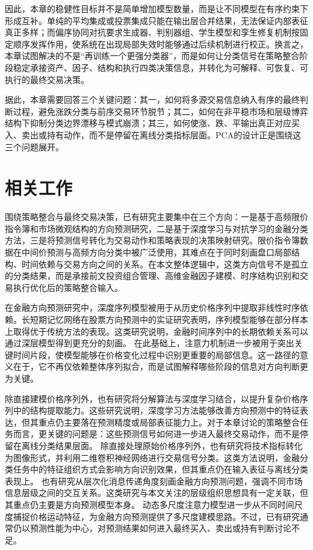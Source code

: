 因此，本章的稳健性目标并不是简单增加模型数量，而是让不同模型在有序约束下形成互补。单纯的平均集成或投票集成只能在输出层合并结果，无法保证内部表征真正多样；而偏序协同对抗要求生成器、判别器组、学生模型和孪生修复机制按固定顺序发挥作用，使系统在出现局部失效时能够通过后续机制进行校正。换言之，本章试图解决的不是“再训练一个更强分类器”，而是如何让分类信号在策略整合阶段稳定承接资产、因子、结构和执行四类决策信息，并转化为可解释、可恢复、可执行的最终交易决策。

据此，本章需要回答三个关键问题：其一，如何将多源交易信息纳入有序的最终判断过程，避免涨跌分类与前序交易环节脱节；其二，如何在非平稳市场和层级博弈结构下抑制分类边界漂移与模式崩溃；其三，如何使涨、跌、平输出真正对应买入、卖出或持有动作，而不是停留在离线分类指标层面。PCA的设计正是围绕这三个问题展开。


\section{相关工作}

围绕策略整合与最终交易决策，已有研究主要集中在三个方向：一是基于高频限价指令簿和市场微观结构的方向预测研究，二是基于深度学习与对抗学习的金融分类方法，三是将预测信号转化为交易动作和策略表现的决策映射研究。限价指令簿数据在中间价预测与高频方向分类中被广泛使用，其难点在于同时刻画盘口局部结构、时间依赖与交易方向之间的关系\cite{ntakaris2018benchmark}。在本文整体逻辑中，这类方向信号不是孤立的分类结果，而是承接前文投资组合管理、高维金融因子建模、时序结构识别和交易执行优化后的策略整合输入。

在金融方向预测研究中，深度序列模型被用于从历史价格序列中提取非线性时序依赖。长短期记忆网络在股票方向预测中的实证研究表明，序列模型能够在部分样本上取得优于传统方法的表现\cite{fischer2018deep}。这类研究说明，金融时间序列中的长期依赖关系可以通过深层模型得到更充分的刻画。
在此基础上，注意力机制进一步被用于突出关键时间片段，使模型能够在价格变化过程中识别更重要的局部信息\cite{chen2019attlstm}。这一路径的意义在于，它不再仅依赖整体序列拟合，而是试图解释哪些阶段的信息对方向判断更为关键。

除直接建模价格序列外，也有研究将分解算法与深度学习结合，以提升复杂价格序列中的结构提取能力\cite{zhang2021based}。这些研究说明，深度学习方法能够改善方向预测中的特征表达，但其重点仍主要落在预测精度或局部表征能力上。对于本章讨论的策略整合任务而言，更关键的问题是：这些预测信号如何进一步进入最终交易动作，而不是停留在离线分类结果层面。
除直接处理原始价格序列外，也有研究将技术指标转化为图像形式，并利用二维卷积神经网络进行交易信号分类\cite{sezer2018algorithmic}。这类方法说明，金融分类任务中的特征组织方式会影响方向识别效果，但其重点仍在输入表征与离线分类表现上。
也有研究从层次化消息传递角度刻画金融方向预测问题，强调不同市场信息层级之间的交互关系\cite{ding2020hmsg}。这类研究与本文关注的层级组织思想具有一定关联，但其重点仍主要是方向预测模型本身。
动态多尺度注意力模型进一步从不同时间尺度捕捉价格运动特征，为金融方向预测提供了多尺度建模思路\cite{yoo2021dtml}。不过，已有研究通常仍以预测性能为中心，对预测结果如何进入最终买入、卖出或持有判断讨论不足。

